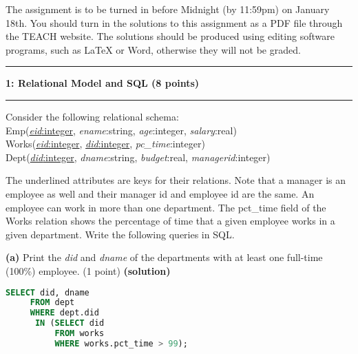 \documentclass[11pt]{article}
\newcommand\question[2]{\vspace{.25in}\hrule\textbf{#1: #2}\vspace{.5em}\hrule\vspace{.10in}}
\renewcommand\part[1]{\vspace{.10in}\textbf{(#1)}}
\begin{document}
\raggedright
\newcommand\NAME{Thomas Noelcke}  %
\newcommand\ANDREWID{noelcket}     %
\newcommand\HWNUM{1}              %

The assignment is to be turned in before Midnight (by 11:59pm) on January 18th. You should turn in the solutions to this assignment as a PDF file through the TEACH website. The solutions should be produced using editing software programs, such as LaTeX or Word, otherwise they will not be graded.

\question{1}{Relational Model and SQL (8 points)} 
Consider the following relational  schema:\\

Emp(\underline{{\it eid}:integer}, {\it ename}:string, {\it age}:integer, {\it salary}:real)\\ 
Works(\underline{{\it eid}:integer}, \underline{{\it did}:integer}, {\it pc\_time}:integer)\\
Dept(\underline{{\it did}:integer}, {\it dname}:string, {\it budget}:real, {\it managerid}:integer)\\
\vspace{10pt}
 
The underlined attributes are keys for their relations.
Note that a manager is an employee as well and their manager id and employee id are the same. 
An employee can work in more than one department. 
The pct\_time field of the Works relation shows the percentage of time that a given employee works in a given department. 
Write the following queries in SQL.


\part{a} Print the {\it did} and {\it dname} of the departments with at least one full-time (100\%) employee. (1 point)
\part{solution}
\begin{lstlisting}[language=SQL]
	SELECT did, dname 
	 FROM dept
	 WHERE dept.did
	  IN (SELECT did
	      FROM works
	      WHERE works.pct_time > 99);
\end{lstlisting}
\end{document}
